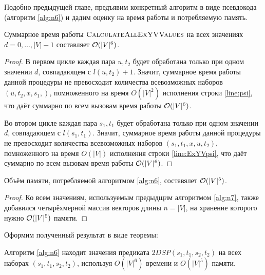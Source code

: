 Подобно предыдущей главе, предъявим конкретный алгоритм в виде псевдокода (алгоритм \ref{alg:n6}) и дадим оценку на время работы и потребляемую память.

\begin{proposition}
Суммарное время работы $\textsc{CalculateAllExYVValues}$ на всех значениях $d = 0, \ldots, |V|-1$ составляет $\mathcal{O}(|V|^6)$. 
\end{proposition}
\begin{proof}
В первом цикле каждая пара $u, t_2$ будет обработана только при одном значении $d$, совпадающем с $l(u, t_2) + 1$. Значит, суммарное время работы данной процедуры не превосходит количества всевозможных наборов $(u, t_2, x, s_1,)$, помноженного на время $O(|V|^2)$ исполнения строки \ref{line:psi}, что даёт суммарно по всем вызовам время работы $\mathcal{O}(|V|^6)$.

Во втором цикле каждая пара $s_1, t_1$ будет обработана только при одном значении $d$, совпадающем с $l(s_1, t_1)$. Значит, суммарное время работы данной процедуры не превосходит количества всевозможных наборов $(s_1, t_1, x, u, t_2)$, помноженного на время $O(|V|)$ исполнения строки \ref{line:ExYVpsi}, что даёт суммарно по всем вызовам время работы $\mathcal{O}(|V|^6)$.
\end{proof}

\begin{proposition}
Объём памяти, потребляемой алгоритмом \ref{alg:n6}, составялет $\mathcal{O}(|V|^5)$.
\end{proposition}
\begin{proof}
Ко всем значениям, используемым предыдщим алгоритмом \ref{alg:n7}, также добавился четырёхмерной массив векторов длины $n = |V|$, на хранение которого нужно $\mathcal{O}(|V|^5)$ памяти.
\end{proof}

Оформим полученный результат в виде теоремы:
\begin{theorem}
Алгоритм \ref{alg:n6} находит значения предиката $2DSP(s_1, t_1, s_2, t_2)$ на всех наборах $(s_1, t_1, s_2, t_2)$, используя $O(|V|^6)$ времени и $O(|V|^5)$ памяти. 
\end{theorem}

